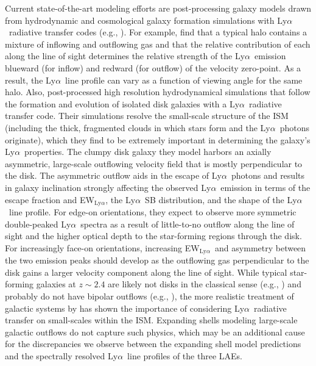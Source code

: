 \documentclass{emulateapj}
\newcommand{\lya}{Ly$\alpha$}
\def\ewlya{EW$_{\mathrm{Ly}\alpha}$}
\begin{document}
Current state-of-the-art modeling efforts are post-processing galaxy models drawn from hydrodynamic and cosmological galaxy formation simulations with \lya\ radiative transfer codes (e.g., \citealp{zheng2010,kollmeier2010,barnes2011,verhamme2012,yajima2012}). For example, \citet{barnes2011} find that a typical halo contains a mixture of inflowing and outflowing gas and that the relative contribution of each along the line of sight determines the relative strength of the \lya\ emission blueward (for inflow) and redward (for outflow) of the velocity zero-point. As a result, the \lya\ line profile can vary as a function of viewing angle for the same halo. Also, \citet{verhamme2012} post-processed high resolution hydrodynamical simulations that follow the formation and evolution of isolated disk galaxies with a \lya\ radiative transfer code. Their simulations resolve the small-scale structure of the ISM (including the thick, fragmented clouds in which stars form and the \lya\ photons originate), which they find to be extremely important in determining the galaxy's \lya\ properties. The clumpy disk galaxy they model harbors an axially asymmetric, large-scale outflowing velocity field that is mostly perpendicular to the disk. The asymmetric outflow aids in the escape of \lya\ photons and results in galaxy inclination strongly affecting the observed \lya\ emission in terms of the escape fraction and \ewlya, the \lya\ SB distribution, and the shape of the \lya\ line profile. For edge-on orientations, they expect to observe more symmetric double-peaked \lya\ spectra as a result of little-to-no outflow along the line of sight and the higher optical depth to the star-forming regions through the disk. For increasingly face-on orientations, increasing \ewlya\ and asymmetry between the two emission peaks should develop as the outflowing gas perpendicular to the disk gains a larger velocity component along the line of sight. While typical star-forming galaxies at $z\sim2.4$ are likely not disks in the classical sense (e.g., \citealp{law2012a}) and probably do not have bipolar outflows (e.g., \citealp{law2012b}), the more realistic treatment of galactic systems by \citet{verhamme2012} has shown the importance of considering \lya\ radiative transfer on small-scales within the ISM. Expanding shells modeling large-scale galactic outflows do not capture such physics, which may be an additional cause for the discrepancies we observe between the expanding shell model predictions and the spectrally resolved \lya\ line profiles of the three LAEs.
\end{document}
